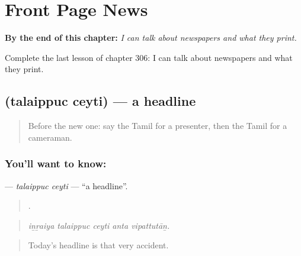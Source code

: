 
\chapter{Front Page News}
\label{ch:ta-front-page-news}

\begin{chapteropening}
\textbf{By the end of this chapter:} \emph{I can talk about newspapers and what they print.}

Complete the last lesson of chapter 306: I can talk about newspapers and what they print.
\end{chapteropening}

\section[\texorpdfstring{\ta{தலைப்புச்} \ta{செய்தி} (talaippuc ceyti)}{தலைப்புச் செய்தி (talaippuc ceyti)}]{  (talaippuc ceyti) — a headline}

\label{lesson:TA-C306-talaippuc-ceyti}



\begin{quote}
Before the new one: say the Tamil for a presenter, then the Tamil for a cameraman.
\end{quote}

\subsection*{You'll want to know:  }
\textbf{ } — \emph{talaippuc ceyti} — \textquotedblleft{}a headline\textquotedblright{}.

\begin{quote}
    .
\end{quote}

\begin{quote}
\emph{iṉṟaiya talaippuc ceyti anta vipattutāṉ.}
\end{quote}

\begin{quote}
Today's headline is that very accident.
\end{quote}

